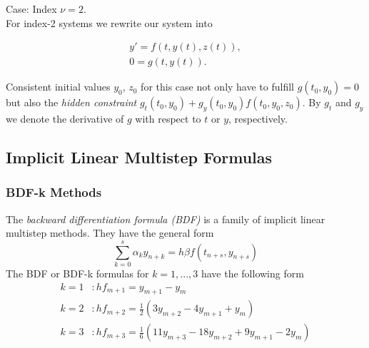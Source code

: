 	\begin{frame}
		Case: Index $\nu = 2$.\\
		
		For index-2 systems we rewrite our system into
		
		\begin{align*}
			y' = f(t,y(t),z(t)), \\
			0 = g(t,y(t)).
		\end{align*}
		
		Consistent initial values $y_0$, $z_0$ for this case not only have to fulfill $g(t_0, y_0) = 0$ but also the \emph{hidden constraint} $g_t(t_0, y_0) + g_y(t_0, y_0)f(t_0, y_0, z_0)$. By $g_t$ and $g_y$ we denote the derivative of $g$ with respect to $t$ or $y$, respectively.
	\end{frame}
	
	\subsection*{Implicit Linear Multistep Formulas}
	
	\subsubsection{BDF-k Methods}
	
	\begin{frame}
		The \emph{backward differentiation formula (BDF)} is a family of implicit linear multistep methods. They have the general form
		\begin{equation}
			\sum_{k=0}^{s} \alpha_k y_{n+k} = h \beta f(t_{n+s}, y_{n+s})
		\end{equation}
		The BDF or BDF-k formulas for $k=1,...,3$ have the following form %
		\begin{align*}
			k = 1 &: h f_{m+1} = y_{m+1} - y_m \\
			k = 2 &: h f_{m+2} = \frac{1}{2} (3 y_{m+2} - 4 y_{m+1} + y_m) \\
			k = 3 &: h f_{m+3} = \frac{1}{6} (11 y_{m+3} - 18 y_{m+2} + 9 y_{m+1} - 2 y_m) %
		\end{align*}
	\end{frame}
	
